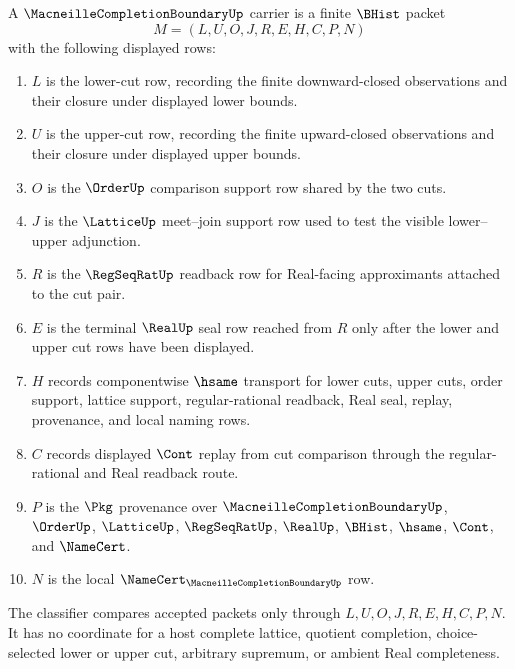 \begin{definition}
\label{def:macneille-completion-boundary-carrier}
A $\MacneilleCompletionBoundaryUp$ carrier is a finite $\BHist$ packet
$$
M=(L,U,O,J,R,E,H,C,P,N)
$$
with the following displayed rows:
\begin{enumerate}
\item $L$ is the lower-cut row, recording the finite downward-closed observations and their closure under displayed lower bounds.
\item $U$ is the upper-cut row, recording the finite upward-closed observations and their closure under displayed upper bounds.
\item $O$ is the $\OrderUp$ comparison support row shared by the two cuts.
\item $J$ is the $\LatticeUp$ meet--join support row used to test the visible lower--upper adjunction.
\item $R$ is the $\RegSeqRatUp$ readback row for Real-facing approximants attached to the cut pair.
\item $E$ is the terminal $\RealUp$ seal row reached from $R$ only after the lower and upper cut rows have been displayed.
\item $H$ records componentwise $\hsame$ transport for lower cuts, upper cuts, order support, lattice support, regular-rational readback, Real seal, replay, provenance, and local naming rows.
\item $C$ records displayed $\Cont$ replay from cut comparison through the regular-rational and Real readback route.
\item $P$ is the $\Pkg$ provenance over $\MacneilleCompletionBoundaryUp$, $\OrderUp$, $\LatticeUp$, $\RegSeqRatUp$, $\RealUp$, $\BHist$, $\hsame$, $\Cont$, and $\NameCert$.
\item $N$ is the local $\NameCert_{\MacneilleCompletionBoundaryUp}$ row.
\end{enumerate}
The classifier compares accepted packets only through $L,U,O,J,R,E,H,C,P,N$. It has no coordinate for a host complete lattice, quotient completion, choice-selected lower or upper cut, arbitrary supremum, or ambient Real completeness.
\end{definition}

